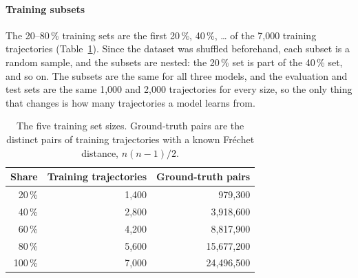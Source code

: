 \paragraph{Training subsets}
The 20--80\,\% training sets are the first 20\,\%, 40\,\%, \ldots{} of the 7{,}000
training trajectories (Table~\ref{tab:training-subsets}). Since the dataset was
shuffled beforehand, each subset is a random sample, and the subsets are nested:
the 20\,\% set is part of the 40\,\% set, and so on. The subsets are the same for
all three models, and the evaluation and test sets are the same 1{,}000 and
2{,}000 trajectories for every size, so the only thing that changes is how many
trajectories a model learns from.

\begin{table}[htbp]
  \centering
  \begin{tabular}{|r|r|r|}
    \hline
    \textbf{Share} & \textbf{Training trajectories} & \textbf{Ground-truth pairs} \\
    \hline
    20\,\%  & 1{,}400 & 979{,}300 \\
    40\,\%  & 2{,}800 & 3{,}918{,}600 \\
    60\,\%  & 4{,}200 & 8{,}817{,}900 \\
    80\,\%  & 5{,}600 & 15{,}677{,}200 \\
    100\,\% & 7{,}000 & 24{,}496{,}500 \\
    \hline
  \end{tabular}
  \caption{The five training set sizes. Ground-truth pairs are the distinct pairs
  of training trajectories with a known Fréchet distance, $n(n-1)/2$.}
  \label{tab:training-subsets}
\end{table}

